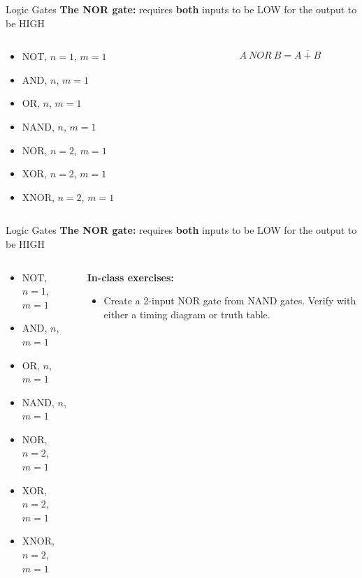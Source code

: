 \documentclass{beamer}
\begin{document}
\begin{frame}{Logic Gates}
\textbf{The NOR gate:} requires \textbf{both} inputs to be LOW for the output to be HIGH \\ \vspace{0.5cm}
\begin{columns}[T]
\begin{column}{0.5\textwidth}
\begin{itemize}
\item \alert{NOT, $n=1$, $m=1$}
\item \alert{AND, $n$, $m=1$}
\item \alert{OR, $n$, $m=1$}
\item \alert{NAND, $n$, $m=1$}
\item \alert{NOR, $n=2$, $m=1$}
\item XOR, $n=2$, $m=1$
\item XNOR, $n=2$, $m=1$
\end{itemize}
\end{column}
\begin{column}{0.5\textwidth}
\begin{equation}
A ~ NOR ~ B = \overline{A+B}
\end{equation}
\end{column}
\end{columns}
\end{frame}

\begin{frame}{Logic Gates}
\textbf{The NOR gate:} requires \textbf{both} inputs to be LOW for the output to be HIGH \\ \vspace{0.5cm}
\begin{columns}[T]
\begin{column}{0.5\textwidth}
\begin{itemize}
\item \alert{NOT, $n=1$, $m=1$}
\item \alert{AND, $n$, $m=1$}
\item \alert{OR, $n$, $m=1$}
\item \alert{NAND, $n$, $m=1$}
\item \alert{NOR, $n=2$, $m=1$}
\item XOR, $n=2$, $m=1$
\item XNOR, $n=2$, $m=1$
\end{itemize}
\end{column}
\begin{column}{0.5\textwidth}
\textbf{In-class exercises:}
\begin{itemize}
\item Create a 2-input NOR gate from NAND gates.  Verify with either a timing diagram or truth table.
\end{itemize}
\end{column}
\end{columns}
\end{frame}
\end{document}
